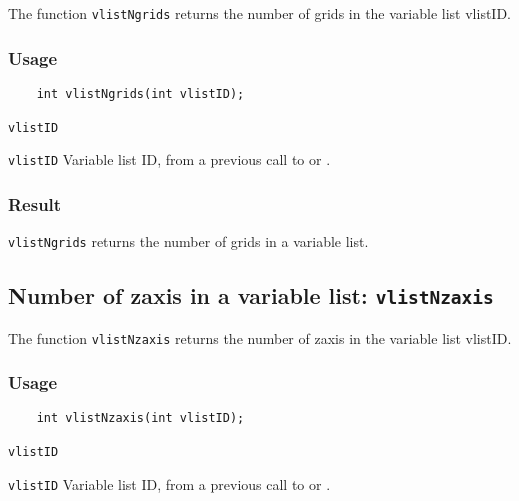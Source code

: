 The function {\texttt{vlistNgrids}} returns the number of grids in the variable list vlistID.

\subsubsection*{Usage}

\begin{verbatim}
    int vlistNgrids(int vlistID);
\end{verbatim}

\hspace*{4mm}\begin{minipage}[]{15cm}
\begin{deflist}{\texttt{vlistID}\ }
\item[\texttt{vlistID}]
Variable list ID, from a previous call to {} or {}.

\end{deflist}
\end{minipage}

\subsubsection*{Result}

{\texttt{vlistNgrids}} returns the number of grids in a variable list.



\subsection{Number of zaxis in a variable list: \texttt{vlistNzaxis}}
\label{vlistNzaxis}

The function {\texttt{vlistNzaxis}} returns the number of zaxis in the variable list vlistID.

\subsubsection*{Usage}

\begin{verbatim}
    int vlistNzaxis(int vlistID);
\end{verbatim}

\hspace*{4mm}\begin{minipage}[]{15cm}
\begin{deflist}{\texttt{vlistID}\ }
\item[\texttt{vlistID}]
Variable list ID, from a previous call to {} or {}.

\end{deflist}
\end{minipage}

